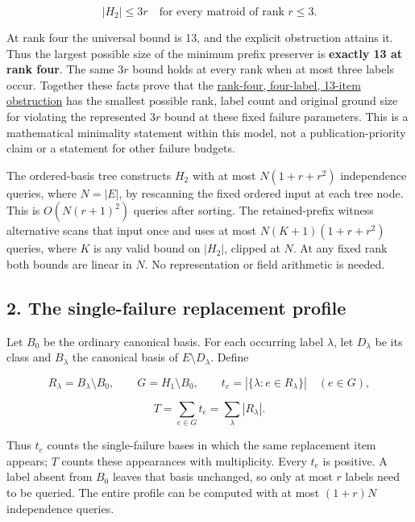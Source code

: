 \[
\boxed{|H_2|\le3r\quad\text{for every matroid of rank }r\le3.}
\tag{TF2}
\]

At rank four the universal bound is 13, and the explicit obstruction attains it. Thus the largest possible size of the minimum prefix preserver is \textbf{exactly 13 at rank four}. The same \(3r\) bound holds at every rank when at most three labels occur. Together these facts prove that the \href{https://github.com/icekylinx/algorithm-frontier/blob/main/problems/matroid-failure-summaries/manuscripts/weighted-oracle-two-failure-obstruction.md}{rank-four, four-label, 13-item obstruction} has the smallest possible rank, label count and original ground size for violating the represented \(3r\) bound at these fixed failure parameters. This is a mathematical minimality statement within this model, not a publication-priority claim or a statement for other failure budgets.

The ordered-basis tree constructs \(H_2\) with at most \(N(1+r+r^2)\) independence queries, where \(N=|E|\), by rescanning the fixed ordered input at each tree node. This is \(O(N(r+1)^2)\) queries after sorting. The retained-prefix witness alternative scans that input once and uses at most \(N(K+1)(1+r+r^2)\) queries, where \(K\) is any valid bound on \(|H_2|\), clipped at \(N\). At any fixed rank both bounds are linear in \(N\). No representation or field arithmetic is needed.

\hypertarget{af-0a3ce40617-the-single-failure-replacement-profile}{%
\subsection{2. The single-failure replacement profile}\label{af-0a3ce40617-the-single-failure-replacement-profile}}

Let \(B_0\) be the ordinary canonical basis. For each occurring label \(\lambda\), let \(D_\lambda\) be its class and \(B_\lambda\) the canonical basis of \(E\setminus D_\lambda\). Define

\[
R_\lambda=B_\lambda\setminus B_0,
\qquad
G=H_1\setminus B_0,
\qquad
t_e=|\{\lambda:e\in R_\lambda\}|\quad(e\in G),
\]

\[
T=\sum_{e\in G}t_e=\sum_\lambda|R_\lambda|.
\tag{TF3}
\]

Thus \(t_e\) counts the single-failure bases in which the same replacement item appears; \(T\) counts these appearances with multiplicity. Every \(t_e\) is positive. A label absent from \(B_0\) leaves that basis unchanged, so only at most \(r\) labels need to be queried. The entire profile can be computed with at most \((1+r)N\) independence queries.

